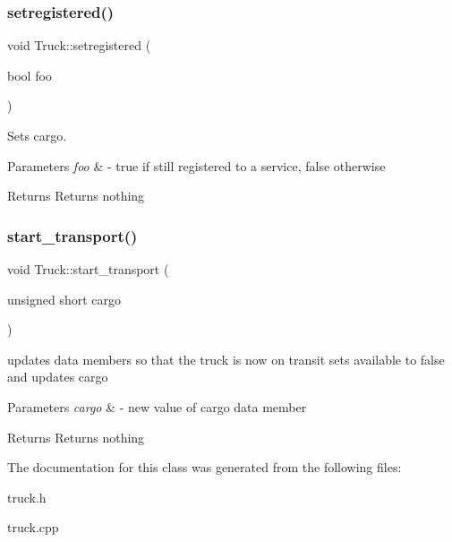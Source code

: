 \subsubsection{\texorpdfstring{setregistered()}{setregistered()}}
{\footnotesize\ttfamily void Truck\+::setregistered (\begin{DoxyParamCaption}\item[{bool}]{foo }\end{DoxyParamCaption})}



Sets cargo. 


\begin{DoxyParams}{Parameters}
{\em foo} & -\/ true if still registered to a service, false otherwise \\
\hline
\end{DoxyParams}
\begin{DoxyReturn}{Returns}
Returns nothing 
\end{DoxyReturn}
\mbox{\label{class_truck_aca68ecb83bcdc73de6bd381dccb70e4d}} 
\subsubsection{\texorpdfstring{start\+\_\+transport()}{start\_transport()}}
{\footnotesize\ttfamily void Truck\+::start\+\_\+transport (\begin{DoxyParamCaption}\item[{unsigned short}]{cargo }\end{DoxyParamCaption})}



updates data members so that the truck is now on transit sets available to false and updates cargo 


\begin{DoxyParams}{Parameters}
{\em cargo} & -\/ new value of cargo data member \\
\hline
\end{DoxyParams}
\begin{DoxyReturn}{Returns}
Returns nothing 
\end{DoxyReturn}


The documentation for this class was generated from the following files\+:\begin{DoxyCompactItemize}
\item 
truck.\+h\item 
truck.\+cpp\end{DoxyCompactItemize}
